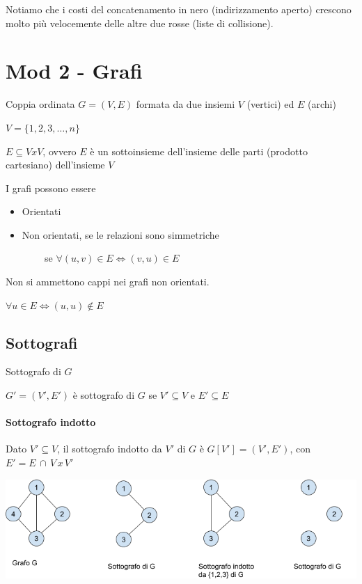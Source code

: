 \documentclass[tikz]{article}
\providecommand{\tightlist}{%
  \setlength{\itemsep}{0pt}\setlength{\parskip}{0pt}}
\let\oldparagraph\paragraph
\renewcommand{\paragraph}[1]{\oldparagraph{#1}\mbox{}}
\begin{document}
{Notiamo che i costi del concatenamento in nero (indirizzamento aperto) crescono molto più velocemente delle altre due rosse (liste di collisione).}

\section{Mod 2 - Grafi}

{Coppia ordinata $G=(V,E)$ formata da due insiemi $V$ (vertici) ed $E$ (archi)}

$V = \{1,2,3,\ldots,n\}$

{$E \subseteq VxV$, ovvero $E$ è un sottoinsieme dell'insieme delle parti (prodotto cartesiano) dell'insieme $V$}

{I grafi possono essere}

\begin{itemize}
\tightlist
\item
  {Orientati}
\item
  {Non orientati, se le relazioni sono simmetriche}
\end{itemize}

{~~~~~~~~se $\forall(u,v) \in E \iff (v,u) \in E$}

{Non si ammettono cappi nei grafi non orientati.}

$\forall u \in E \iff (u,u) \notin E$

\subsection{Sottografi}

{Sottografo di $G$}

{$G'=(V',E')$ è sottografo di $G$ se $V'\subseteq V$ e $E'\subseteq E$}

\paragraph{Sottografo  indotto}

{Dato $V' \subseteq V$, il sottografo indotto da $V'$ di $G$ è $G[V']=(V',E')$, con $E' = E\,\cap\,V\,x\,V'$}

\includegraphics{images/image534.png}
\end{document}
